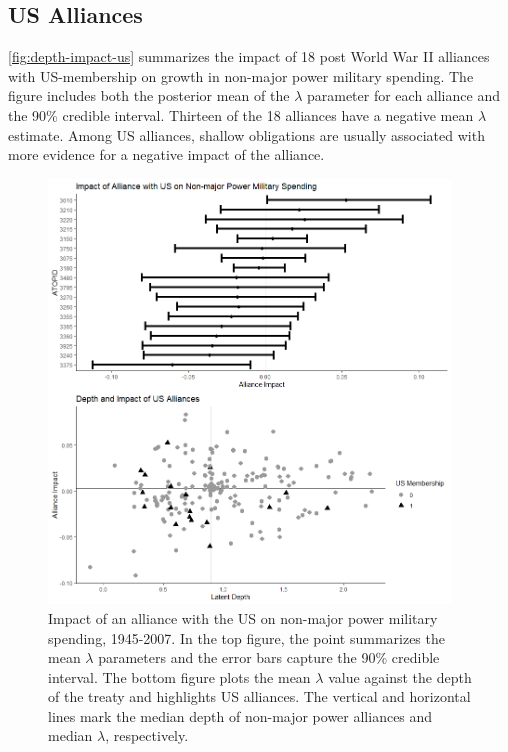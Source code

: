 \documentclass[12pt]{article}
\begin{document}
\subsection{US Alliances}


\autoref{fig:depth-impact-us} summarizes the impact of 18 post World War II alliances with US-membership on growth in non-major power military spending.
The figure includes both the posterior mean of the $\lambda$ parameter for each alliance and the 90\% credible interval. 
Thirteen of the 18 alliances have a negative mean $\lambda$ estimate. 
Among US alliances, shallow obligations are usually associated with more evidence for a negative impact of the alliance. 


\begin{figure}[htbp]
	\centering
		\includegraphics[width=0.95\textwidth]{../figures/depth-impact-us.png}
	\caption{Impact of an alliance with the US on non-major power military spending, 1945-2007. In the top figure, the point summarizes the mean $\lambda$ parameters and the error bars capture the 90\% credible interval. The bottom figure plots the mean $\lambda$ value against the depth of the treaty and highlights US alliances. The vertical and horizontal lines mark the median depth of non-major power alliances and median $\lambda$, respectively.}
	\label{fig:depth-impact-us}
\end{figure}
\end{document}
